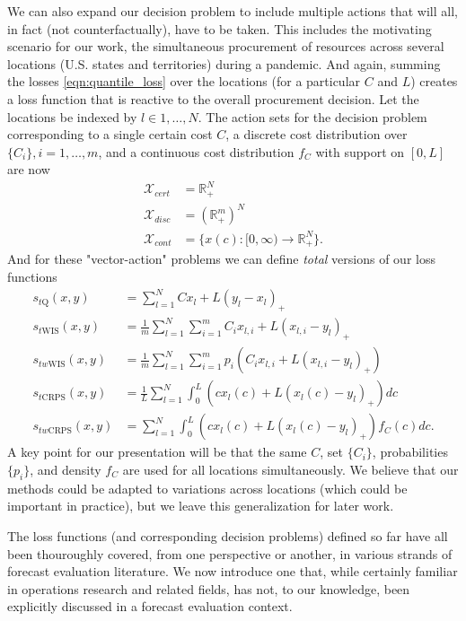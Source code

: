 \documentclass{article}
\begin{document}
We can also expand our decision problem to include multiple actions that will all, in fact (not counterfactually), have to be taken.  This includes the motivating scenario for our work, the simultaneous procurement of resources across several locations (U.S. states and territories) during a pandemic. And again, summing the losses  \eqref{eqn:quantile_loss} over the locations (for a particular $C$ and $L$) creates a loss function that is reactive to the overall procurement decision. Let the locations be indexed by $l \in 1,\ldots,N$.  The action sets for the decision problem corresponding to a single certain cost $C$, a discrete cost distribution over $\{C_i\}, i = 1,\ldots,m$, and a continuous cost distribution $f_C$ with support on $[0,L]$ are now
\begin{align}
\mathcal{X}_{cert} &= \mathbb{R}_{+}^N \\
\mathcal{X}_{disc} &= (\mathbb{R}_{+}^m)^N\\
\mathcal{X}_{cont} &= \{x(c):[0,\infty) \to \mathbb{R}_{+}^N\}.
\end{align}
And for these "vector-action" problems we can define \emph{total} versions of our loss functions
\begin{align}
s_{t\mathrm{Q}}(x,y) &= \sum_{l=1}^N Cx_l + L(y_l-x_l)_+ \\
s_{t\mathrm{WIS}}(x,y) &= \frac{1}{m}\sum_{l=1}^N \sum_{i=1}^{m}C_i x_{l,i} + L(x_{l,i} - y_l)_+ \\
s_{tw\mathrm{WIS}}(x,y) &= \frac{1}{m}\sum_{l=1}^N \sum_{i=1}^{m}p_i(C_i x_{l,i} + L(x_{l,i} - y_l)_+)\\
s_{t\mathrm{CRPS}}(x,y) &= \frac{1}{L} \sum_{l=1}^N\int_{0}^{L} (cx_l(c) + L(x_l(c) - y_l)_+) dc \\
s_{tw\mathrm{CRPS}}(x,y) &= \sum_{l=1}^N \int_{0}^{L} (cx_l(c) + L(x_l(c) - y_l)_+) f_C(c)dc.
\end{align}
A key point for our presentation will be that the same $C$, set $\{C_i\}$, probabilities $\{p_i\}$, and density $f_C$ are used for all locations simultaneously.  We believe that our methods could be adapted to variations across locations (which could be important in practice), but we leave this generalization for later work.  

The loss functions (and corresponding decision problems) defined so far  have all been thouroughly covered, from one perspective or another, in various strands of forecast evaluation literature.  We now introduce one that, while certainly familiar in operations research and related fields, has not, to our knowledge, been explicitly discussed in a forecast evaluation context. 
\end{document}
